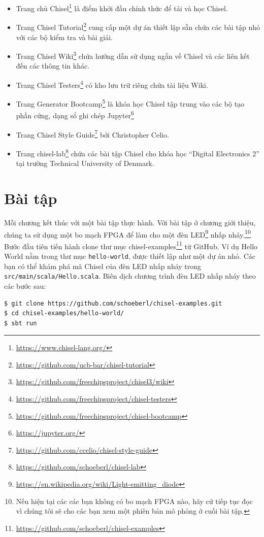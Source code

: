 \documentclass[%
    10pt,
    headinclude, footexclude,
    openright, %
    notitlepage,
    cleardoubleempty,
    headsepline,
    pointlessnumbers,
    bibtotoc, idxtotoc,
    ]{scrbook}
\newcommand{\code}[1]{{\small{\texttt{#1}}}}
\newcommand{\myref}[2]{\href{#1}{#2}}
\renewcommand{\myref}[2]{{#2}{\footnote{\url{#1}}}}
\begin{document}
\begin{itemize}
\item Trang chủ \myref{https://www.chisel-lang.org/}{Chisel} là điểm khởi đầu chính thức để tải và học Chisel.
\item Trang \myref{https://github.com/ucb-bar/chisel-tutorial}{Chisel Tutorial} cung cấp một dự án thiết lập sẵn chứa các bài tập nhỏ với các bộ kiểm tra và bài giải.
\item Trang \myref{https://github.com/freechipsproject/chisel3/wiki}{Chisel Wiki} chứa hướng dẫn sử dụng ngắn về Chisel và các liên kết đến các thông tin khác.
\item Trang \myref{https://github.com/freechipsproject/chisel-testers}{Chisel Testers} có kho lưu trữ riêng chứa tài liệu Wiki.
\item Trang \myref{https://github.com/freechipsproject/chisel-bootcamp}{Generator Bootcamp} là khóa học Chisel tập trung vào các bộ tạo phần cứng, dạng sổ ghi chép \myref{https://jupyter.org/}{Jupyter}
\item Trang \myref{https://github.com/ccelio/chisel-style-guide}{Chisel Style Guide} bởi Christopher Celio.
\item Trang \myref{https://github.com/schoeberl/chisel-lab}{chisel-lab} chứa các bài tập Chisel cho khóa học ``Digital Electronics 2'' tại trường Technical University of Denmark.
\end{itemize}

\section{Bài tập}

Mỗi chương kết thúc với một bài tập thực hành. Với bài tập ở chương giới thiệu, chúng ta sử dụng một bo mạch FPGA để làm cho một đèn \myref{https://en.wikipedia.org/wiki/Light-emitting_diode}{LED} nhấp nháy.\footnote{Nếu hiện tại các các bạn không có bo mạch FPGA nào, hãy cứ tiếp tục đọc vì chúng tôi sẽ cho các bạn xem một phiên bản mô phỏng ở cuối bài tập.}
Bước đầu tiên tiến hành clone thư mục \myref{https://github.com/schoeberl/chisel-examples}{chisel-examples} từ GitHub.
Ví dụ Hello World nằm trong thư mục \code{hello-world}, được thiết lập như một dự án nhỏ. Các bạn có thể khám phá mã Chisel của đèn LED nhấp nháy
trong \code{src/main/scala/Hello.scala}.
Biên dịch chương trình đèn LED nhấp nháy theo các bước sau:

\begin{verbatim}
$ git clone https://github.com/schoeberl/chisel-examples.git
$ cd chisel-examples/hello-world/
$ sbt run
\end{verbatim}
\end{document}
